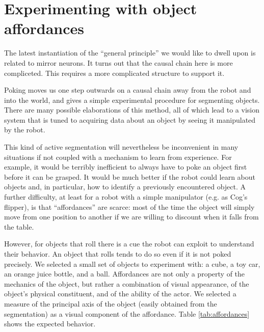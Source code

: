 
\section{Experimenting with object affordances}

\ifverbose
The latest instantiation of the ``general principle'' we would like to
dwell upon is related to mirror neurons. It turns out that the causal
chain here is more compliceted. This requires a more complicated
structure to support it.
\fi

Poking moves us one step outwards on a causal chain away from the
robot and into the world, and gives a simple experimental procedure
for segmenting objects.  There are many possible elaborations of this
method, all of which lead to a vision system that is tuned to 
acquiring data about an object by seeing it manipulated by the robot.  

This kind of active segmentation will nevertheless be inconvenient in many situations if not 
coupled with a mechanism to learn from experience. For example, it 
would be terribly inefficient to always have to poke an object first
before it can be grasped.
It would be much better if the robot could learn about
objects and, in particular, how to identify a previously encountered object. 
A further difficulty, at least for a robot with a simple 
manipulator (e.g. as Cog's flipper), is that ``affordances'' are scarce: 
most of the time the object will simply move from one position
to another if we are willing to discount when it falls from the table.

However, for objects that roll there is a cue the robot can exploit
to understand their behavior. An object that rolls tends to do so even 
if it is not poked precisely. We selected a small set of objects to
experiment with: a cube, a toy car, an orange juice bottle, and a ball.
Affordances are not only a property of the mechanics of the object, but 
rather a combination of visual appearance, of the object's physical 
constituent, and of the ability of the actor. We selected a measure of
the principal axis of the object (easily obtained from the segmentation)
as a visual component of the affordance. Table \ref{tab:affordances} 
shows the expected behavior.

